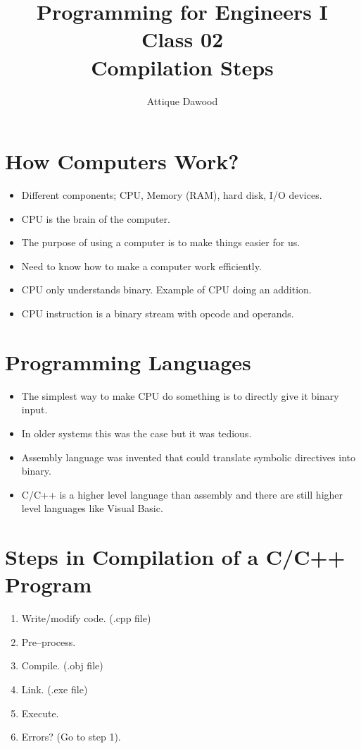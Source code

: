 \documentclass[12pt,a4paper]{article}
\title{\vspace{-2cm}Programming for Engineers I\\Class 02\\Compilation Steps}
\author{Attique Dawood}
\begin{document}
\maketitle
\section{How Computers Work?}
\begin{itemize}
\item Different components; CPU, Memory (RAM), hard disk, I/O devices.
\item CPU is the brain of the computer.
\item The purpose of using a computer is to make things easier for us.
\item Need to know how to make a computer work efficiently.
\item CPU only understands binary. Example of CPU doing an addition.
\item CPU instruction is a binary stream with opcode and operands.
\end{itemize}
\section{Programming Languages}
\begin{itemize}
\item The simplest way to make CPU do something is to directly give it binary input.
\item In older systems this was the case but it was tedious.
\item Assembly language was invented that could translate symbolic directives into binary.
\item C/C++ is a higher level language than assembly and there are still higher level languages like Visual Basic.
\end{itemize}
\section{Steps in Compilation of a C/C++ Program}
\begin{enumerate}
\item Write/modify code. (.cpp file)
\item Pre--process.
\item Compile. (.obj file)
\item Link. (.exe file)
\item Execute.
\item Errors? (Go to step 1).
\end{enumerate}
\end{document}
